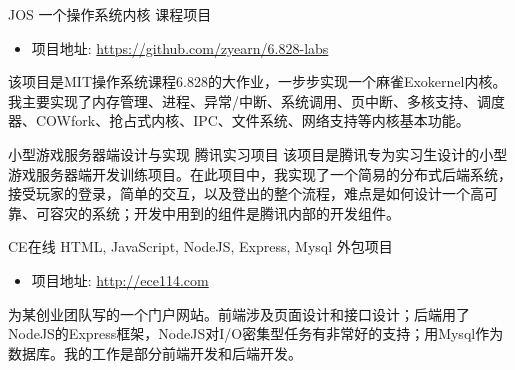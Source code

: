 \documentclass[11pt,a4paper]{moderncv}
\begin{document}
{JOS}
{一个操作系统内核}
{课程项目}
{}
{
\begin{itemize}
    \item 项目地址: \url{https://github.com/zyearn/6.828-labs}
\end{itemize}
该项目是MIT操作系统课程6.828的大作业，一步步实现一个麻雀Exokernel内核。我主要实现了内存管理、进程、异常/中断、系统调用、页中断、多核支持、调度器、COWfork、抢占式内核、IPC、文件系统、网络支持等内核基本功能。
}
\vspace*{0.4\baselineskip}

{小型游戏服务器端设计与实现}
{腾讯实习项目}
{}
{}
{
该项目是腾讯专为实习生设计的小型游戏服务器端开发训练项目。在此项目中，我实现了一个简易的分布式后端系统，接受玩家的登录，简单的交互，以及登出的整个流程，难点是如何设计一个高可靠、可容灾的系统；开发中用到的组件是腾讯内部的开发组件。
}
\vspace*{0.4\baselineskip}

{CE在线}
{HTML, JavaScript, NodeJS, Express, Mysql}
{外包项目}
{}
{
\begin{itemize}
    \item 项目地址: \url{http://ece114.com}
\end{itemize}
为某创业团队写的一个门户网站。前端涉及页面设计和接口设计；后端用了NodeJS的Express框架，NodeJS对I/O密集型任务有非常好的支持；用Mysql作为数据库。我的工作是部分前端开发和后端开发。
}
\vspace*{0.4\baselineskip}



\end{document}
